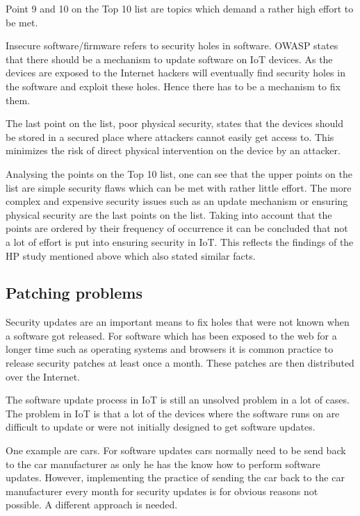 \documentclass[conference]{IEEEtran}
\begin{document}
Point 9 and 10 on the Top 10 list are topics which demand a rather high effort 
to be met.

Insecure software/firmware refers to security holes in software. OWASP states 
that there should be a mechanism to update software on IoT devices. As the 
devices are exposed to the Internet hackers will eventually find security holes 
in the software and exploit these holes. Hence there has to be a mechanism to 
fix them.

The last point on the list, poor physical security, states that the devices 
should be stored in a secured place where attackers cannot easily get access 
to. This minimizes the risk of direct physical intervention on the device by an 
attacker.

Analysing the points on the Top 10 list, one can see that the upper points on 
the list are simple security flaws which can be met with rather little effort. 
The more complex and expensive security issues such as an update mechanism or 
ensuring physical security are the last points on the list. Taking into account 
that the points are ordered by their frequency of occurrence it can be 
concluded that not a lot of effort is put into ensuring security in IoT. This 
reflects the findings of the HP study mentioned above which also stated similar 
facts.


\subsection{Patching problems}
Security updates are an important means to fix holes that were not known when a 
software got released. For software which has been exposed to the web for a 
longer time such as operating systems and browsers it is common practice to 
release security patches at least once a month. These patches are then 
distributed over the Internet.

The software update process in IoT is still an unsolved problem in a lot of 
cases. The problem in IoT is that a lot of the devices where the software runs 
on are difficult to update or were not initially designed to get software 
updates. 

One example are cars. For software updates cars normally need to be send back 
to the car manufacturer as only he has the know how to perform software 
updates. However, implementing the practice of sending the car back to the car 
manufacturer every month for security updates is for obvious reasons not 
possible. A different approach is needed.
\end{document}
